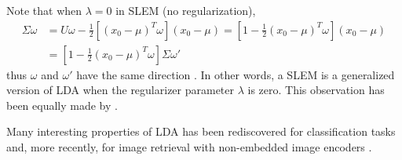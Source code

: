 Note that when $\lambda=0$ in SLEM (no regularization),
\begin{align}
\Sigma \omega & = U\omega -\frac{1}{2}[(x_0-\mu)^T \omega] (x_0-\mu) =
\left[1-\frac{1}{2}(x_0-\mu)^T \omega\right](x_0-\mu) \\
&=\left[1-\frac{1}{2}(x_0-\mu)^T \omega\right]\Sigma \omega'
\end{align}
thus $\omega$ and $\omega'$ have the same direction . In other words, a
SLEM is a generalized version of LDA when the
regularizer parameter $\lambda $ is zero.
This observation has been equally made by \cite{Koba15}.

Many interesting properties of LDA has been rediscovered for classification tasks \cite{GMPD12,HMR12} and, more recently, for image retrieval with non-embedded image encoders \cite{babenko15}.



